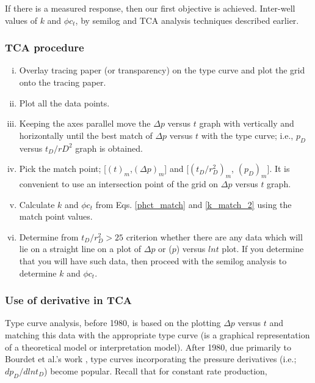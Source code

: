 \documentclass{llncs}
\numberwithin{equation}{section}
\numberwithin{figure}{section}
\numberwithin{table}{section}
\begin{document}
    If there is a measured response, then our first objective is achieved. Inter-well values of $k$ and $\phi c_{t}$,  by semilog and TCA analysis techniques described earlier.

    \subsubsection{TCA procedure}

    \begin{enumerate}[(i)]
        \item   Overlay tracing paper (or transparency) on the type curve and plot the grid onto the tracing paper.
        \item   Plot all the data points.
        \item   Keeping the axes parallel move the $\Delta p$ versus $t$ graph with vertically and horizontally until the best match of $\Delta p$ versus $t$ with the type curve; i.e., $p_{D}$ versus $t_{D}/r{D}^{2}$ graph is obtained.
        \item   Pick the match point; [$(t)_{m}$,$(\Delta p)_{m}$] and [$(t_{D}/r_{D}^{2})_{m}$, $(p_{D})_{m}$]. It is convenient to use an intersection point of the grid on $\Delta p$ versus $t$ graph.
        \item   Calculate $k$ and $\phi c_{t}$ from Eqs. \ref{phct_match} and \ref{k_match_2} using the match point values.
        \item   Determine from $t_{D}/r_{D}^{2}>25$ criterion whether there are any data which will lie on a straight line on a plot of $\Delta p$ or ($p$) versus $lnt$ plot. If you determine that you will have such data, then proceed with the semilog analysis to determine $k$ and $\phi c_{t}$.
    \end{enumerate}

    \subsubsection{Use of derivative in TCA}
    Type curve analysis, before 1980, is based on the plotting $\Delta p$ versus $t$ and matching this data with the appropriate type curve (is a graphical representation of a theoretical model or interpretation model). After 1980, due primarily to Bourdet et al.'s work \cite{Bourdet_1983_1}, type curves incorporating the pressure derivatives (i.e.; $dp_{D}/dlnt_{D}$) become popular.
    Recall that for constant rate production, 
\end{document}
